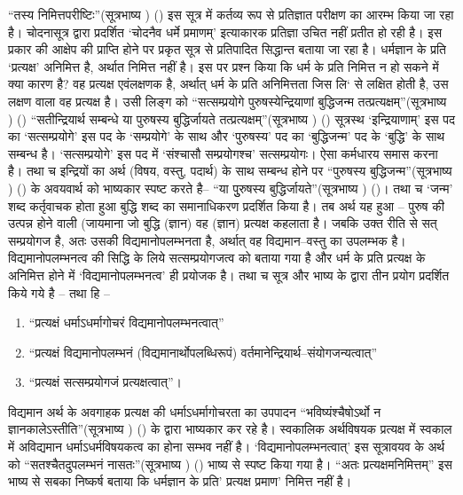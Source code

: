 “तस्य निमित्तपरीष्टिः”(सूत्रभाष्य ) () इस सूत्र में कर्तव्य रूप से प्रतिज्ञात परीक्षण का आरम्भ किया जा रहा है। चोदनासूत्र द्वारा प्रदर्शित ‘चोदनैव धर्मे प्रमाणम्' इत्याकारक प्रतिज्ञा उचित नहीं प्रतीत हो रही है। इस प्रकार की आक्षेप की प्राप्ति होने पर प्रकृत सूत्र से प्रतिपादित सिद्धान्त बताया जा रहा है। धर्मज्ञान के प्रति ‘प्रत्यक्ष' अनिमित्त है, अर्थात निमित्त नहीं है। इस पर प्रश्न किया कि धर्म के प्रति निमित्त न हो सकने में क्या कारण है? वह प्रत्यक्ष एवंलक्षणक है, अर्थात् धर्म के प्रति अनिमित्तता जिस लि‘ से लक्षित होती है, उस लक्षण वाला वह प्रत्यक्ष है। उसी लिङ्ग को “सत्सम्प्रयोगे पुरुषस्येन्द्रियाणां बुद्धिजन्म तत्प्रत्यक्षम्”(सूत्रभाष्य ) () “सतीन्द्रियार्थ सम्बन्धे या पुरुषस्य बुद्धिर्जायते तत्प्रत्यक्षम्”(सूत्रभाष्य ) () सूत्रस्थ ‘इन्द्रियाणाम्' इस पद का ‘सत्सम्प्रयोगे' इस पद के ‘सम्प्रयोगे' के साथ और ‘पुरुषस्य' पद का ‘बुद्धिजन्म' पद के ‘बुद्धि' के साथ सम्बन्ध है। ‘सत्सम्प्रयोगे' इस पद में ‘संश्चासौ सम्प्रयोगश्च' सत्सम्प्रयोगः। ऐसा कर्मधारय समास करना है। तथा च इन्द्रियों का अर्थ (विषय, वस्तु, पदार्थ) के साथ सम्बन्ध होने पर “पुरुषस्य बुद्धिजन्म”(सूत्रभाष्य ) () के अवयवार्थ को भाष्यकार स्पष्ट करते है– “या पुुरुषस्य बुद्धिर्जायते”(सूत्रभाष्य ) ()। तथा च ‘जन्म' शब्द कर्तृवाचक होता हुआ बुद्धि शब्द का समानाधिकरण प्रदर्शित किया है। तब अर्थ यह हुआ – पुरुष की उत्पन्न होने वाली (जायमाना जो बुद्धि (ज्ञान) वह (ज्ञान) प्रत्यक्ष कहलाता है। जबकि उक्त रीति से सत् सम्प्रयोगज है, अतः उसकी विद्यमानोपलम्भनता है, अर्थात् वह विद्यमान–वस्तु का उपलम्भक है। विद्यमानोपलम्भनत्व की सिद्धि के लिये सत्सम्प्रयोगजत्व को बताया गया है और धर्म के प्रति प्रत्यक्ष के अनिमित्त होने में ‘विद्यमानोपलम्भनत्व' ही प्रयोजक है। तथा च सूत्र और भाष्य के द्वारा तीन प्रयोग प्रदर्शित किये गये है – तथा हि –

\begin{enumerate}
\item “प्रत्यक्षं धर्माऽधर्मागोचरं विद्यमानोपलम्भनत्वात्”

 \item “प्रत्यक्षं विद्यमानोपलम्भनं (विद्यमानार्थोपलब्धिरूपं) वर्तमानेन्द्रियार्थ–संयोगजन्यत्वात्”

 \item “प्रत्यक्षं सत्सम्प्रयोगजं प्रत्यक्षत्वात्”।

\end{enumerate}

विद्यमान अर्थ के अवगाहक प्रत्यक्ष की धर्माऽधर्मागोचरता का उपपादन “भविष्यंश्चैषोऽर्थो न ज्ञानकालेऽस्तीति”(सूत्रभाष्य ) () के द्वारा भाष्यकार कर रहे है। स्वकालिक अर्थविषयक प्रत्यक्ष में स्वकाल में अविद्यमान धर्माऽधर्मविषयकत्व का होना सम्भव नहीं है। ‘विद्यमानोपलम्भनत्वात्' इस सूत्रावयव के अर्थ को “सतश्चैतदुपलम्भनं नासतः”(सूत्रभाष्य ) () भाष्य से स्पष्ट किया गया है। “अतः प्रत्यक्षमनिमित्तम्” इस भाष्य से सबका निष्कर्ष बताया कि धर्मज्ञान के प्रति' प्रत्यक्ष प्रमाण' निमित्त नहीं है।

